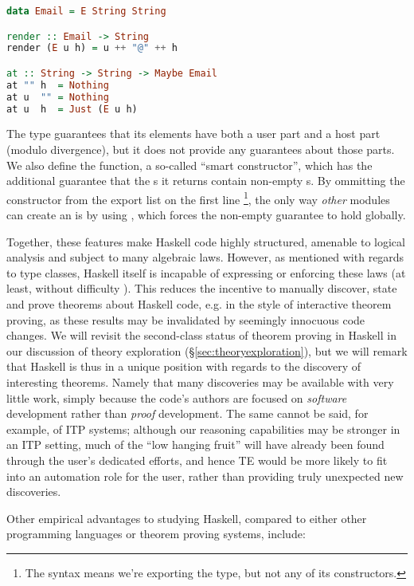 \begin{description}
\begin{lstlisting}[language=Haskell, xleftmargin=.2\textwidth, xrightmargin=.2\textwidth, upquote=true]
data Email = E String String

render :: Email -> String
render (E u h) = u ++ "@" ++ h

at :: String -> String -> Maybe Email
at "" h  = Nothing
at u  "" = Nothing
at u  h  = Just (E u h)
\end{lstlisting}

The  type guarantees that its elements have both a user part and a host part (modulo divergence), but it does not provide any guarantees about those parts. We also define the  function, a so-called ``smart constructor'', which has the additional guarantee that the s it returns contain non-empty s. By ommitting the  constructor from the export list on the first line \footnote{The syntax  means we're exporting the  type, but not any of its constructors.}, the only way \emph{other} modules can create an  is by using , which forces the non-empty guarantee to hold globally.

\end{description}

Together, these features make Haskell code highly structured, amenable to logical analysis and subject to many algebraic laws. However, as mentioned with regards to type classes, Haskell itself is incapable of expressing or enforcing these laws (at least, without difficulty \citep{lindley2014hasochism}). This reduces the incentive to manually discover, state and prove theorems about Haskell code, e.g. in the style of interactive theorem proving, as these results may be invalidated by seemingly innocuous code changes. We will revisit the second-class status of theorem proving in Haskell in our discussion of theory exploration (\S \ref{sec:theoryexploration}), but we will remark that Haskell is thus in a unique position with regards to the discovery of interesting theorems. Namely that many discoveries may be available with very little work, simply because the code's authors are focused on \emph{software} development rather than \emph{proof} development. The same cannot be said, for example, of ITP systems; although our reasoning capabilities may be stronger in an ITP setting, much of the ``low hanging fruit'' will have already been found through the user's dedicated efforts, and hence TE would be more likely to fit into an automation role for the user, rather than providing truly unexpected new discoveries.

Other empirical advantages to studying Haskell, compared to either other programming languages or theorem proving systems, include:

